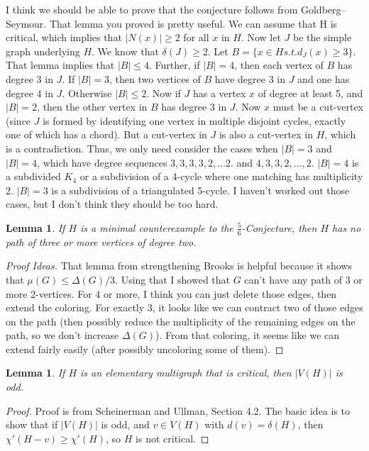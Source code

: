 \documentclass[12pt]{amsart}
\theoremstyle{plain}
\newtheorem{lem}[thm]{Lemma}
\theoremstyle{definition}
\theoremstyle{remark}
\begin{document}
\bigskip
\bigskip

I think we should be able to prove that the conjecture follows from
Goldberg--Seymour.
That lemma you proved is pretty useful.  We can assume that H is
critical, which implies that $|N(x)| \ge 2$ for all $x$ in $H$.  Now let $J$
be the simple graph underlying $H$.  We know that $\delta(J) \ge 2$.  Let
$B = \{ x \in H s.t. d_J(x) \ge 3\}$.  That lemma implies that $|B| \le 4$.
Further, if $|B| = 4$, then each vertex of $B$ has degree 3 in $J$.  If
$|B|=3$, then two vertices of $B$ have degree 3 in $J$ and one has degree 4
in $J$.  Otherwise $|B| \le 2$.  Now if $J$ has a vertex $x$ of degree at
least 5, and $|B|=2$, then the other vertex in $B$ has degree 3 in $J$.  Now
$x$ must be a cut-vertex (since $J$ is formed by identifying one vertex in
multiple disjoint cycles, exactly one of which has a chord).  But a
cut-vertex in $J$ is also a cut-vertex in $H$, which is a contradiction.
Thus, we only need consider the cases when $|B|=3$ and $|B|=4$, which have
degree sequences $3,3,3,3,2,\ldots2$. and $4,3,3,2,\ldots,2$.
$|B|=4$ is a subdivided $K_4$ or a subdivision of a 4-cycle where one
matching has multiplicity 2.
$|B|=3$ is a subdivision of a triangulated 5-cycle.  I haven't worked
out those cases, but I don't think they should be too hard.

\begin{lem}
If $H$ %
is a minimal counterexample to the $\frac56$-Conjecture, then $H$ has no
path of three or more vertices of degree two.
\label{no3path}
\end{lem}
\begin{proof}[Proof Ideas]
That lemma from strengthening Brooks is
helpful because it shows that $\mu(G) \le \Delta(G)/3$.  Using that I
showed that $G$ can't have any path of 3 or more 2-vertices.  For 4 or
more, I think you can just delete those edges, then extend the
coloring.  For exactly 3, it looks like we can contract two of those
edges on the path (then possibly reduce the multiplicity of the
remaining edges on the path, so we don't increase $\Delta(G)$). 
From that coloring, it seems like we can extend fairly easily
(after possibly uncoloring some of them).
\end{proof}

\begin{lem}
If $H$ is an elementary multigraph that is critical, then $|V(H)|$ is odd.
\label{elem-odd}
\end{lem}
\begin{proof}
Proof is from Scheinerman and Ullman, Section 4.2.  The basic idea is to show
that if $|V(H)|$ is odd, and $v\in V(H)$ with $d(v)=\delta(H)$, then
$\chi'(H-v)\ge \chi'(H)$, so $H$ is not critical.
\end{proof}
\end{document}
